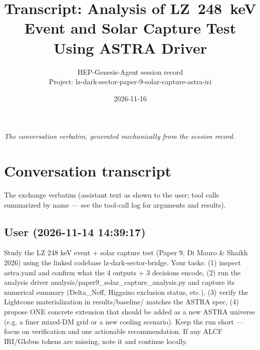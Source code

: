 \documentclass[11pt,a4paper]{article}
\title{Transcript: Analysis of LZ~248~keV Event and Solar Capture Test Using ASTRA Driver}
\author{HEP-Genesis-Agent session record \\ \small Project: lz-dark-sector-paper-9-solar-capture-astra-iri}
\date{2026-11-16}
\begin{document}
\maketitle
\noindent\textit{\small The conversation verbatim, generated mechanically from the session record.}
\vspace{1em}



\appendix
\section{Conversation transcript}
\label{app:transcript}
The exchange verbatim (assistant text as shown to the user; tool calls summarized by name --- see the tool-call log for arguments and results).
\subsection*{User \small(2026-11-14 14:39:17)}
Study the LZ 248 keV event + solar capture test (Paper 9, Di Mauro \& Shaikh 2026) using the linked codebase lz-dark-sector-bridge. Your tasks: (1) inspect astra.yaml and confirm what the 4 outputs + 3 decisions encode, (2) run the analysis driver analysis/paper9\_solar\_capture\_analysis.py and capture its numerical summary (Delta\_Neff, Higgsino exclusion status, etc.), (3) verify the Lightcone materialization in results/baseline/ matches the ASTRA spec, (4) propose ONE concrete extension that should be added as a new ASTRA universe (e.g. a finer mixed-DM grid or a new cooling scenario). Keep the run short --- focus on verification and one actionable recommendation. If any ALCF IRI/Globus tokens are missing, note it and continue locally.
\end{document}
